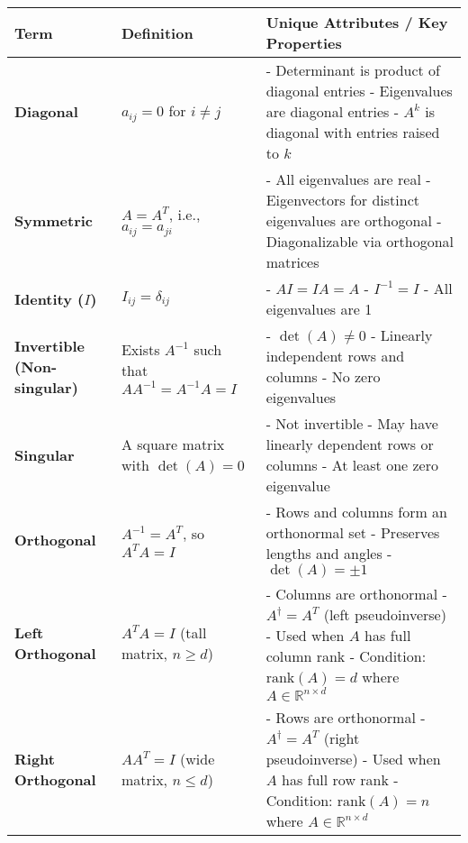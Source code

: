\documentclass[12pt]{article}
\begin{document}
\begin{longtable}{|>{\bfseries}m{3.5cm}|m{5cm}|m{10.5cm}|}
		\hline
		\textbf{Term} & \textbf{Definition} & \textbf{Unique Attributes /
		Key Properties} \\
		\hline
		Diagonal & $a_{ij} = 0$ for $i \ne j$ &
		- Determinant is product of diagonal entries \newline
		- Eigenvalues are diagonal entries \newline
		- $A^k$ is diagonal with entries raised to $k$ \\
		\hline
		Symmetric & $A = A^T$, i.e., $a_{ij} = a_{ji}$ &
		- All eigenvalues are real \newline
		- Eigenvectors for distinct eigenvalues are orthogonal \newline
		- Diagonalizable via orthogonal matrices \\
		\hline
		Identity ($I$) & $I_{ij} = \delta_{ij}$ &
		- $AI = IA = A$ \newline
		- $I^{-1} = I$ \newline
		- All eigenvalues are 1 \\
		\hline
		Invertible (Non-singular) & Exists $A^{-1}$ such that $AA^{-1} =
		A^{-1}A = I$ &
		- $\det(A) \ne 0$ \newline
		- Linearly independent rows and columns \newline
		- No zero eigenvalues \\
		\hline
		Singular & A square matrix with $\det(A) = 0$ &
		- Not invertible \newline
		- May have linearly dependent rows or columns \newline
		- At least one zero eigenvalue \\
		\hline
		Orthogonal & $A^{-1} = A^T$, so $A^T A = I$ &
		- Rows and columns form an orthonormal set \newline
		- Preserves lengths and angles \newline
		- $\det(A) = \pm 1$ \\
		\hline
		Left Orthogonal & $A^T A = I$ (tall matrix, $n \geq d$) &
		- Columns are orthonormal \newline
		- $A^\dagger = A^T$ (left pseudoinverse) \newline
		- Used when $A$ has full column rank \newline
		- Condition: $\text{rank}(A) = d$ where $A \in \mathbb{R}^{n \times d}$ \\
		\hline
		Right Orthogonal & $A A^T = I$ (wide matrix, $n \leq d$) &
		- Rows are orthonormal \newline
		- $A^\dagger = A^T$ (right pseudoinverse) \newline
		- Used when $A$ has full row rank \newline
		- Condition: $\text{rank}(A) = n$ where $A \in \mathbb{R}^{n \times d}$ \\


\end{longtable}
\end{document}
